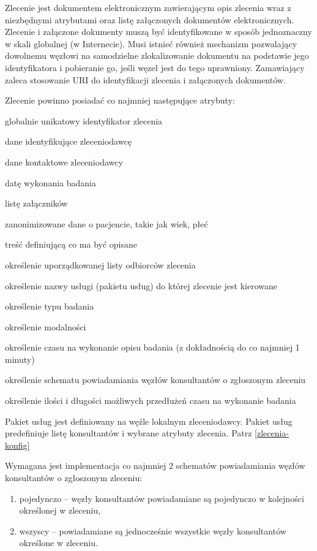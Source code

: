 \documentclass[a4paper]{report}
\begin{document}
Zlecenie jest dokumentem elektronicznym zawierającym opis zlecenia wraz z niezbędnymi atrybutami oraz listę załączonych dokumentów elektronicznych. Zlecenie i załączone dokumenty muszą być identyfikowane w sposób jednoznaczny w skali globalnej (w Internecie). Musi istnieć również mechanizm pozwalający dowolnemu węzłowi na samodzielne zlokalizowanie dokumentu na podstawie jego identyfikatora i pobieranie go, jeśli węzeł jest do tego uprawniony. Zamawiający zaleca stosowanie URI do identyfikacji zlecenia i załączonych dokumentów.

Zlecenie powinno posiadać co najmniej następujące atrybuty:
\begin{enumerate*}
\item globalnie unikatowy identyfikator zlecenia
\item dane identyfikujące zleceniodawcę
\item dane kontaktowe zleceniodawcy
\item datę wykonania badania
\item listę załączników 
\item zanonimizowane dane o pacjencie, takie jak wiek, płeć
\item treść definiującą co ma być opisane
\item określenie uporządkowanej listy odbiorców zlecenia
\item określenie nazwy usługi (pakietu usług) do której zlecenie jest kierowane
\item określenie typu badania
\item określenie modalności
\item określenie czasu na wykonanie opisu badania (z dokładnością do co najmniej 1 minuty)
\item określenie schematu powiadamiania węzłów konsultantów o zgłoszonym zleceniu 
\item określenie ilości i długości możliwych przedłużeń czasu na wykonanie badania
\end{enumerate*}

Pakiet usług jest definiowany na węźle lokalnym zleceniodawcy. Pakiet usług predefiniuje listę konsultantów i wybrane atrybuty zlecenia. Patrz \ref{zlecenia-konfig}

Wymagana jest implementacja co najmniej 2 schematów powiadamiania węzłów konsultantów o zgłoszonym zleceniu:
\begin{enumerate}
 \item pojedynczo -- węzły konsultantów powiadamiane są pojedynczo w kolejności określonej w zleceniu,
 \item wszyscy -- powiadamiane są jednocześnie wszystkie węzły konsultantów określone w zleceniu.
\end{enumerate}
\end{document}
